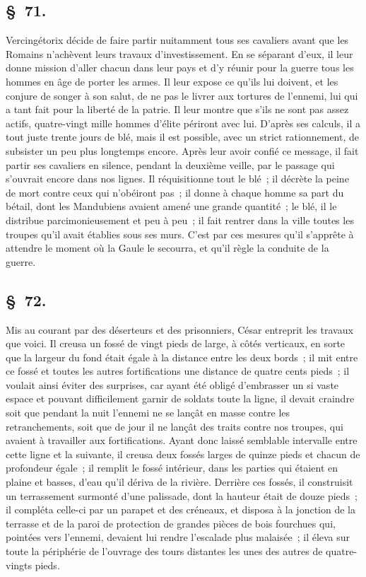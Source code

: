 \documentclass[french,twoside]{book} %
\begin{document}
\subsection[{§ 71.}]{ \textsc{§ 71.} }
\noindent Vercingétorix décide de faire partir nuitamment tous ses cavaliers avant que les Romains n’achèvent leurs travaux d’investissement. En se séparant d’eux, il leur donne mission d’aller chacun dans leur pays et d’y réunir pour la guerre tous les hommes en âge de porter les armes. Il leur expose ce qu’ils lui doivent, et les conjure de songer à son salut, de ne pas le livrer aux tortures de l’ennemi, lui qui a tant fait pour la liberté de la patrie. Il leur montre que s’ils ne sont pas assez actifs, quatre-vingt mille hommes d’élite périront avec lui. D'après ses calculs, il a tout juste trente jours de blé, mais il est possible, avec un strict rationnement, de subsister un peu plus longtemps encore. Après leur avoir confié ce message, il fait partir ses cavaliers en silence, pendant la deuxième veille, par le passage qui s’ouvrait encore dans nos lignes. Il réquisitionne tout le blé ; il décrète la peine de mort contre ceux qui n’obéiront pas ; il donne à chaque homme sa part du bétail, dont les Mandubiens avaient amené une grande quantité ; le blé, il le distribue parcimonieusement et peu à peu ; il fait rentrer dans la ville toutes les troupes qu’il avait établies sous ses murs. C'est par ces mesures qu’il s’apprête à attendre le moment où la Gaule le secourra, et qu’il règle la conduite de la guerre.
\subsection[{§ 72.}]{ \textsc{§ 72.} }
\noindent Mis au courant par des déserteurs et des prisonniers, César entreprit les travaux que voici. Il creusa un fossé de vingt pieds de large, à côtés verticaux, en sorte que la largeur du fond était égale à la distance entre les deux bords ; il mit entre ce fossé et toutes les autres fortifications une distance de quatre cents pieds ; il voulait ainsi éviter des surprises, car ayant été obligé d’embrasser un si vaste espace et pouvant difficilement garnir de soldats toute la ligne, il devait craindre soit que pendant la nuit l’ennemi ne se lançât en masse contre les retranchements, soit que de jour il ne lançât des traits contre nos troupes, qui avaient à travailler aux fortifications. Ayant donc laissé semblable intervalle entre cette ligne et la suivante, il creusa deux fossés larges de quinze pieds et chacun de profondeur égale ; il remplit le fossé intérieur, dans les parties qui étaient en plaine et basses, d’eau qu’il dériva de la rivière. Derrière ces fossés, il construisit un terrassement surmonté d’une palissade, dont la hauteur était de douze pieds ; il compléta celle-ci par un parapet et des créneaux, et disposa à la jonction de la terrasse et de la paroi de protection de grandes pièces de bois fourchues qui, pointées vers l’ennemi, devaient lui rendre l’escalade plus malaisée ; il éleva sur toute la périphérie de l’ouvrage des tours distantes les unes des autres de quatre-vingts pieds.
\end{document}
